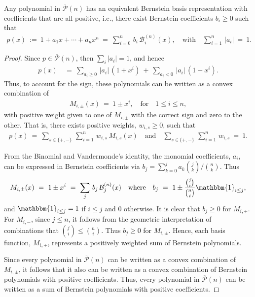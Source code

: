 \documentclass[10pt,a4paper]{amsart}
\begin{document}
\begin{theorem}
Any polynomial in $\overline{\mathcal{P}}(n)$ has an equivalent Bernstein basis representation with coefficients that are all positive, i.e., there exist Bernstein coefficients $b_i\geq 0$ such that
\begin{align}
    p(x)\ :=\ 1 + a_1x + \cdots + a_n x^n\ =\ \sum_{i=0}^n\, b_i\, \mathcal{B}^{(n)}_i(x), \quad\text{with}\quad \sum_{i=1}^n\, |a_i|\ =\ 1.
\end{align}
\end{theorem}

\begin{proof}
Since $p\in \overline{\mathcal{P}}(n)$, then $\sum_i|a_i|=1$, and hence
\begin{align}
    p(x)\ &=\ \sum_{a_i\geq 0}\,|a_i|\,(1 + x^i)\ +\ \sum_{a_i < 0}\,|a_i|\,(1 - x^i).
\end{align}
Thus, to account for the sign, these polynomials can be written as a convex combination of
\begin{align}
    M_{i, \pm}(x)\ =\ 1 \pm x^i,\quad \text{for}\quad 1\leq i\leq n,
\end{align}
with positive weight given to one of $M_{i,\pm}$ with the correct sign and zero to the other. That is, there exists positive weights, $w_{i, s}\geq 0$, such that 
\begin{align}
    p(x)\ =\ \sum_{s\in\{+, -\}}\,\sum_{i=1}^n\, w_{i, s}\, M_{i, s}(x)\quad \text{and}\quad \sum_{s\in\{+, -\}}\, \sum_{i=1}^n\, w_{i, s}\ =\ 1.
\end{align}

From the Binomial and Vandermonde's identity, the monomial coefficients, $a_i$, can be expressed in Bernstein coefficients via $b_j = \sum_{k=0}^j a_k \binom{j}{k} / \binom{n}{k}$. Thus
\begin{align}
    M_{i, \pm}(x)\ =\ 1 \pm x^i\ =\ \sum_{j}\, b_j\, \mathcal{B}^{(n)}_j(x)\quad\text{where}\quad b_j\ =\ 1 \pm \frac{\binom{j}{i}}{\binom{n}{i}}\mathbbm{1}_{i\leq j},
\end{align}
and $\mathbbm{1}_{i\leq j} = 1$ if $i\leq j$ and $0$ otherwise. It is clear that $b_j\geq 0$ for $M_{i, +}$. For $M_{i, -}$, since $j\leq n$, it follows from the geometric interpretation of combinations that $\binom{j}{i}\leq\binom{n}{i}$.
Thus $b_j\geq 0$ for $M_{i, \pm}$. Hence, each basis function, $M_{i, \pm}$, represents a positively weighted sum of Bernstein polynomials.

Since every polynomial in $\overline{\mathcal{P}}(n)$ can be written as a convex combination of $M_{i, \pm}$, it follows that it also can be written as a convex combination of Bernstein polynomials with positive coefficients. Thus, every polynomial in $\overline{\mathcal{P}}(n)$ can be written as a sum of Bernstein polynomials with positive coefficients.
\end{proof}
\end{document}

